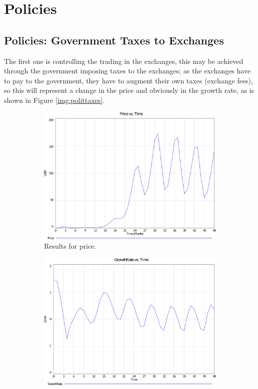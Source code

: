 \section{Policies}
   
   \subsection{Policies: Government Taxes to Exchanges}
   The first one is controlling the trading in the exchanges, this may be achieved through the government imposing taxes to the exchanges; as the exchanges have to pay to the government, they have to augment their own taxes (exchange fees), so this will represent a change in the price and obviously in the growth rate, as is shown in Figure \ref{img:polittaxes}.
   
   \begin{figure}[H]
      \centering
      \begin{subfigure}[t]{0.4\textwidth}
        \includegraphics[scale = 0.3]{files/politTaxesPrice.pdf}
        \centering
        \caption{Results for price.}
      \end{subfigure}
      \hspace{1cm}
      \begin{subfigure}[t]{0.4\textwidth}
        \includegraphics[scale = 0.3]{files/politTaxesGrowth.pdf}

\end{subfigure}
\end{figure}
